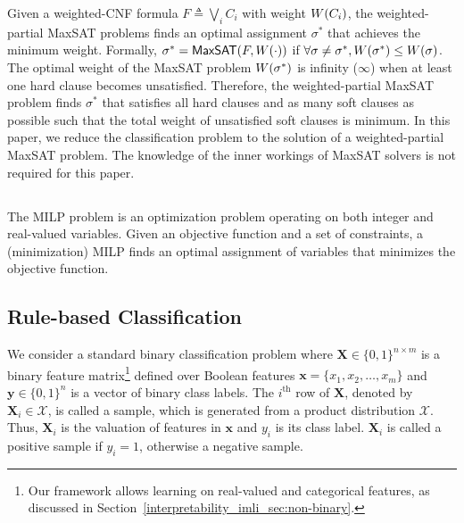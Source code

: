 Given a weighted-CNF formula $F \triangleq \bigvee_i C_i$ with weight $ W \! \left( C_i \right) $, the weighted-partial MaxSAT problems finds an optimal assignment $\sigma^*$ that achieves the minimum weight. Formally,  $\sigma^* = \mathsf{MaxSAT}(F,W \! \left( \cdot \right))$ if $\forall \sigma \neq \sigma^*, W \! \left( \sigma^* \right) \leq W \! \left( \sigma \right)$. The optimal weight of the MaxSAT problem $  W \! \left( \sigma^* \right) $ is infinity ($ \infty $) when at least one hard clause becomes unsatisfied.  Therefore,  the weighted-partial MaxSAT problem finds $ \sigma^* $ that satisfies all hard clauses and as many soft clauses as possible such that the total weight of unsatisfied soft clauses is minimum. In this paper, we reduce the classification problem  to the solution of a weighted-partial MaxSAT problem. The knowledge of the inner workings of {MaxSAT} solvers is  not required for this paper.  


\subsection*{}
The MILP problem is an optimization problem operating on both integer and real-valued variables. Given an objective function and a set of constraints, a (minimization) MILP finds an optimal assignment of variables that minimizes the objective function.


\subsection*{Rule-based Classification}

We consider a standard binary classification problem where $ \mathbf{X} \in \{0,1\}^{n\times m} $ is a binary feature matrix\footnote{Our framework allows learning on real-valued and categorical features, as discussed in Section~\ref{interpretability_imli_sec:non-binary}.} defined over Boolean features $\mathbf{x} = \{x_1, x_2, \dots, x_m\}$ and $ \mathbf{y} \in \{0,1\}^n $ is a vector of binary class labels.  The $ i^\text{th} $ row of $ \mathbf{X} $, denoted by $ \mathbf{X}_i \in \mathcal{X} $, is called a sample, which is generated from a product distribution $ \mathcal{X} $. Thus, $ \mathbf{X}_i $ is the valuation of features in $ \mathbf{x} $ and $ y_i $ is its class label.  $ \mathbf{X}_i $ is called a positive sample if $ y_i = 1 $, otherwise a negative sample.


